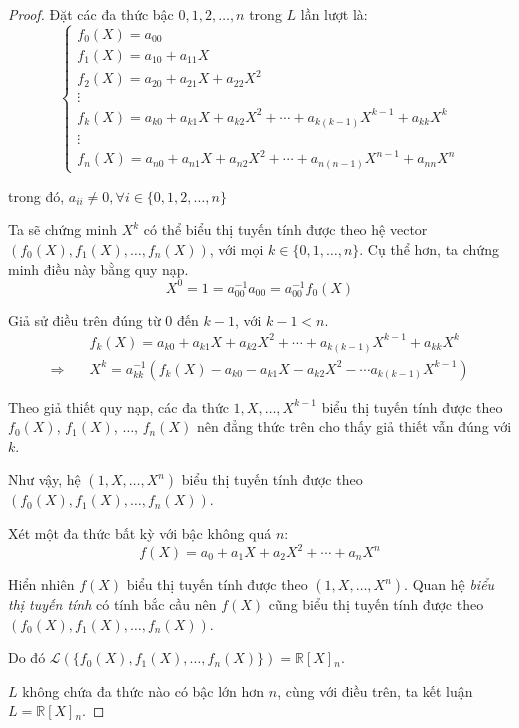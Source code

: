 \documentclass[class=linearalgebra,crop=false]{standalone}
\begin{document}
\begin{proof}Đặt các đa thức bậc $0, 1, 2,\ldots, n$ trong $L$ lần lượt là:
    \[
        \begin{cases}
            f_{0}(X) = a_{00}                                                                    \\
            f_{1}(X) = a_{10} + a_{11}X                                                          \\
            f_{2}(X) = a_{20} + a_{21}X + a_{22}X^{2}                                            \\
            \vdots                                                                               \\
            f_{k}(X) = a_{k0} + a_{k1}X + a_{k2}X^{2} + \cdots + a_{k(k-1)}X^{k-1} + a_{kk}X^{k} \\
            \vdots                                                                               \\
            f_{n}(X) = a_{n0} + a_{n1}X + a_{n2}X^{2} + \cdots + a_{n(n-1)}X^{n-1} + a_{nn}X^{n}
        \end{cases}
    \]
    \par trong đó, $a_{ii}\ne 0, \forall i\in\{0, 1, 2,\ldots, n\}$
    \par Ta sẽ chứng minh $X^{k}$ có thể biểu thị tuyến tính được theo hệ vector $(f_{0}(X), f_{1}(X), \ldots, f_{n}(X))$, với mọi $k\in\{0,1,\ldots, n\}$. Cụ thể hơn, ta chứng minh điều này bằng quy nạp.
    \[ X^{0} = 1 = a^{-1}_{00}a_{00} = a^{-1}_{00}f_{0}(X) \]
    \par Giả sử điều trên đúng từ $0$ đến $k-1$, với $k-1 < n$.
    \begin{align*}
                         & f_{k}(X) = a_{k0} + a_{k1}X + a_{k2}X^{2} + \cdots + a_{k(k-1)}X^{k-1} + a_{kk}X^{k}      \\
        \Rightarrow\quad & X^{k} = a^{-1}_{kk}(f_{k}(X) - a_{k0} - a_{k1}X - a_{k2}X^{2} - \cdots a_{k(k-1)}X^{k-1})
    \end{align*}
    \par Theo giả thiết quy nạp, các đa thức $1, X, \ldots, X^{k-1}$ biểu thị tuyến tính được theo $f_{0}(X)$, $f_{1}(X)$, $\ldots$, $f_{n}(X)$ nên đẳng thức trên cho thấy giả thiết vẫn đúng với $k$.
    \par Như vậy, hệ $(1, X, \ldots, X^{n})$ biểu thị tuyến tính được theo $(f_{0}(X), f_{1}(X), \ldots, f_{n}(X))$.
    \par Xét một đa thức bất kỳ với bậc không quá $n$:
    \[ f(X) = a_{0} + a_{1}X + a_{2}X^{2} + \cdots + a_{n}X^{n} \]
    \par Hiển nhiên $f(X)$ biểu thị tuyến tính được theo $(1, X, \ldots, X^{n})$. Quan hệ \textit{biểu thị tuyến tính} có tính bắc cầu nên $f(X)$ cũng biểu thị tuyến tính được theo $(f_{0}(X), f_{1}(X), \ldots, f_{n}(X))$.
    \par Do đó $\mathcal{L}(\{f_{0}(X), f_{1}(X),\ldots, f_{n}(X)\}) = \mathbb{R}[X]{}_{n}$.
    \par $L$ không chứa đa thức nào có bậc lớn hơn $n$, cùng với điều trên, ta kết luận $L = \mathbb{R}[X]{}_{n}$.
\end{proof}
\end{document}
